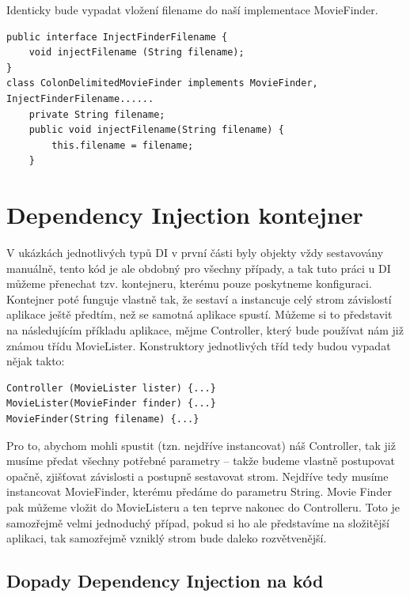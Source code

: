 \documentclass[a4paper,conference]{IEEEtran}
\begin{document}
Identicky bude vypadat vložení filename do naší implementace MovieFinder.

\lstset{language=Java,caption=Implementace MovieLister u InterfaceInjection,label=listing:Java}
\begin{lstlisting}
public interface InjectFinderFilename {
    void injectFilename (String filename);
}
class ColonDelimitedMovieFinder implements MovieFinder, InjectFinderFilename......
    private String filename;
    public void injectFilename(String filename) {
        this.filename = filename;
    }
\end{lstlisting}

\section{Dependency Injection kontejner}
\label{sec:Container}

V ukázkách jednotlivých typů DI v první části byly objekty vždy sestavovány manuálně, tento kód je ale obdobný pro všechny případy, a tak tuto práci u DI můžeme přenechat tzv. kontejneru, kterému pouze poskytneme konfiguraci. Kontejner poté funguje vlastně tak, že sestaví a instancuje celý strom závislostí aplikace ještě předtím, než se samotná aplikace spustí. Můžeme si to představit na následujícím příkladu aplikace, mějme Controller, který bude používat nám již známou třídu MovieLister. Konstruktory jednotlivých tříd tedy budou vypadat nějak takto:

\lstset{language=Java,caption=Konstruktory tříd k příkladu,label=listing:Java}
\begin{lstlisting}
Controller (MovieLister lister) {...}
MovieLister(MovieFinder finder) {...}
MovieFinder(String filename) {...}
\end{lstlisting}

Pro to, abychom mohli spustit (tzn. nejdříve instancovat) náš Controller, tak již musíme předat všechny potřebné parametry – takže budeme vlastně postupovat opačně, zjišťovat závislosti a postupně sestavovat strom. Nejdříve tedy musíme instancovat MovieFinder, kterému předáme do parametru String. Movie Finder pak můžeme vložit do MovieListeru a ten teprve nakonec do Controlleru. Toto je samozřejmě velmi jednoduchý případ, pokud si ho ale představíme na složitější aplikaci, tak samozřejmě vzniklý strom bude daleko rozvětvenější.

\subsection{Dopady Dependency Injection na kód}
\end{document}
